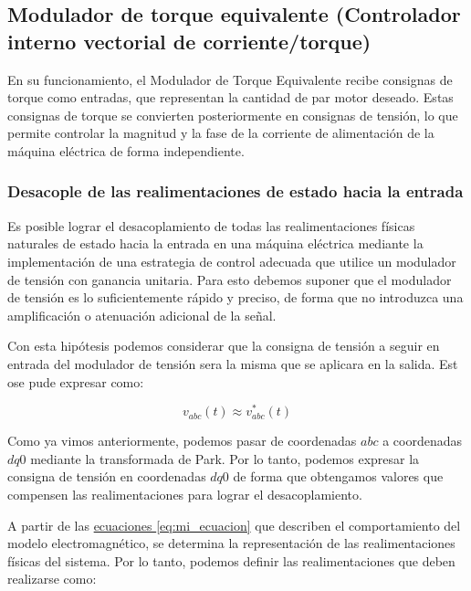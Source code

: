 \documentclass{article}
\begin{document}

\subsection{Modulador de torque equivalente (Controlador interno vectorial de corriente/torque)}

En su funcionamiento, el Modulador de Torque Equivalente recibe consignas de torque como entradas, 
que representan la cantidad de par motor deseado. Estas consignas de torque se convierten posteriormente 
en consignas de tensión, lo que permite controlar la magnitud y la fase de la corriente de alimentación 
de la máquina eléctrica de forma independiente.


\subsubsection{Desacople de las realimentaciones de estado hacia la entrada}

Es posible lograr el desacoplamiento de todas las realimentaciones físicas naturales de 
estado hacia la entrada en una máquina eléctrica mediante la implementación de una estrategia 
de control adecuada que utilice un modulador de tensión con ganancia unitaria. Para esto debemos 
suponer que el modulador de tensión es lo suficientemente rápido y preciso, de forma que no 
introduzca una amplificación o atenuación adicional de la señal. 

Con esta hipótesis podemos considerar que la consigna de tensión a seguir en entrada del modulador 
de tensión sera la misma que se aplicara en la salida. Est ose pude expresar como: 

\begin{equation}
    v_{abc}(t) \approx v^*_{abc}(t)
\end{equation}

Como ya vimos anteriormente, podemos pasar de coordenadas $abc$ a coordenadas $dq0$ mediante la
transformada de Park. Por lo tanto, podemos expresar la consigna de tensión en coordenadas $dq0$
de forma que obtengamos valores que compensen las realimentaciones para lograr el desacoplamiento.

A partir de las \hyperref[eq:mi_ecuacion]{ecuaciones \ref*{eq:mi_ecuacion}} que describen el comportamiento
del modelo electromagnético, se determina la representación de las realimentaciones físicas del sistema. 
Por lo tanto, podemos definir las realimentaciones que deben realizarse como:
\end{document}
